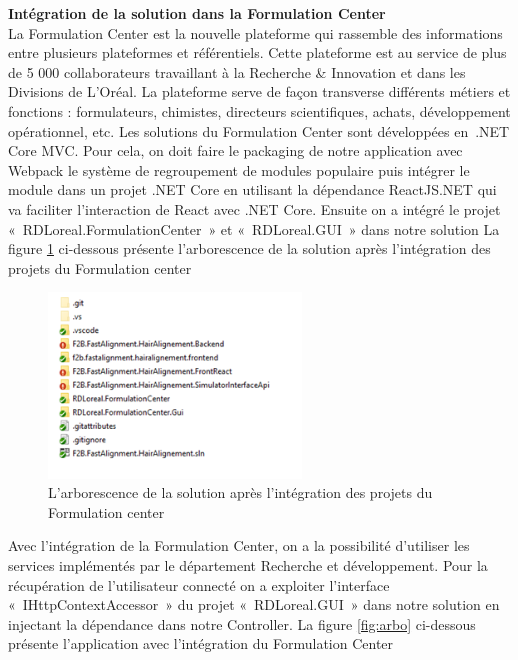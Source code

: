 \newpage
\textbf{Intégration de la solution dans la Formulation Center}
\\
La Formulation Center est la nouvelle plateforme qui rassemble des informations entre plusieurs plateformes et référentiels. Cette plateforme est au service de plus de 5 000 collaborateurs travaillant à la Recherche & Innovation et dans les Divisions de L’Oréal. La plateforme serve de façon transverse différents métiers et fonctions : formulateurs, chimistes, directeurs scientifiques, achats, développement opérationnel, etc.
Les solutions du Formulation Center sont développées en .NET Core MVC. Pour cela, on doit faire le packaging de notre application avec Webpack le système de regroupement de modules populaire puis intégrer le module dans un projet .NET Core en utilisant la dépendance ReactJS.NET qui va faciliter l’interaction de React avec .NET Core.
Ensuite on a intégré le projet « RDLoreal.FormulationCenter » et « RDLoreal.GUI » dans notre solution 
La figure \ref{fig:dox} ci-dessous présente l’arborescence de la solution après l’intégration des projets du Formulation center 

\begin{figure}[!ht]\centering
\includegraphics[width=0.6\textwidth]{chapitres/chapitre5/figures/Structure.png}
\caption{L’arborescence de la solution après l’intégration des projets du Formulation center }
\label{fig:dox}
\end{figure}

Avec l’intégration de la Formulation Center, on a la possibilité d’utiliser les services implémentés par le département Recherche et développement. 
Pour la récupération de l’utilisateur connecté on a exploiter l’interface « IHttpContextAccessor » du projet « RDLoreal.GUI » dans notre solution en injectant la dépendance dans notre Controller. 
La figure \ref{fig:arbo} ci-dessous présente l’application avec l’intégration du Formulation Center

